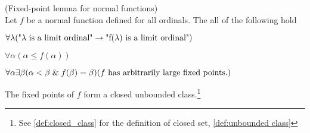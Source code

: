 \begin{lemma}{(Fixed-point lemma for normal functions)}\label{lemma:normal_fixed_point}\\
Let $f$ be a normal function defined for all ordinals. The all of the following hold
\bce[(i)]
\item $\forall \lambda(\mbox{"$\lambda$ is a limit ordinal"} \rightarrow \mbox{"f($\lambda$) is a limit ordinal"})$
\item $\forall \alpha (\alpha \leq f(\alpha))$
\item $\forall \alpha \exists \beta (\alpha < \beta \mathrel{\&} f(\beta) = \beta) \mbox{($f$ has arbitrarily large fixed points.)}$
\item The fixed points of $f$ form a closed unbounded class.\footnote{See \ref{def:closed_class} for the definition of closed set, \ref{def:unbounded class}}
\ece
\end{lemma}

